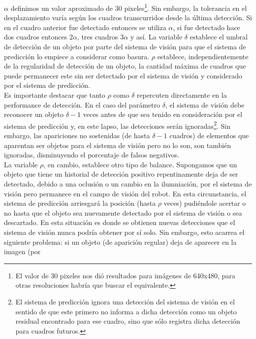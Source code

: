 $\alpha$ definimos un valor aproximado de 30 pixeles\footnote{ El 
valor de 30 pixeles nos di\'o resultados para im\'agenes de 640x480, para 
otras resoluciones habr\'ia que buscar el equivalente.}. Sin embargo, la 
tolerancia en el desplazamiento var\'ia seg\'un los cuadros transcurridos desde la \'ultima 
detecci\'on. Si en el cuadro anterior fue detectado entonces se utiliza 
$\alpha$, si fue detectado hace dos cuadros entonces $2\alpha$, tres 
cuadros $3\alpha$ y as\'i. La variable $\delta$ establece el umbral de 
detecci\'on de un objeto por parte del sistema de visi\'on para que el 
sistema de predicci\'on lo empiece  a considerar como basura. $\rho$ establece, 
independientemente de la  
regularidad de detecci\'on de un objeto, la cantidad m\'axima de cuadros que puede 
permanecer este sin ser detectado por el sistema de visi\'on y 
considerado por el sistema de predicci\'on. \\  	
\indent Es importante destacar que tanto $\rho$ como $\delta$ repercuten directamente en la 
performance de detecci\'on. En el caso del par\'ametro $\delta$, el 
sistema de visi\'on debe reconocer un objeto $\delta -1$ veces antes de que sea 
tenido en consideraci\'on por el sistema de predicci\'on y, en este lapso, las 
detecciones ser\'an ignoradas\footnote{El sistema de predicci\'on ignora 
una detecci\'on del sistema de visi\'on en el sentido de que este primero 
no informa a dicha detecci\'on como un objeto residual encontrado para 
ese cuadro, sino que s\'olo registra dicha detecci\'on para 
cuadros futuros.}. Sin embargo, las apariciones no sostenidas 
(de hasta $\delta -1$ cuadros) de elementos que aparentan ser objetos 
para el sistema de visi\'on pero no lo son, son tambi\'en ignoradas, 
disminuyendo el porcentaje de falsos negativos.\\
\indent La variable $\rho$, en cambio, establece otro tipo de balance. 
Supongamos que un objeto que tiene un historial de detecci\'on 
positivo repentinamente deja de ser detectado, debido a una oclusi\'on 
o un cambio en la ilumniaci\'on, por el sistema de visi\'on 
pero permanece en el campo de visi\'on del robot. En esta 
circunstancia, el sistema de predicci\'on 
arriesgar\'a la posici\'on (hasta $\rho$ veces) pudi\'endole acertar o no hasta que el objeto 
sea nuevamente detectado por el sistema de visi\'on o sea descartado.
En esta situaci\'on es donde se obtienen nuevas detecciones que el 
sistema de visi\'on nunca podr\'ia obtener por s\'i solo. Sin embargo, 
esto acarrea el siguiente problema: si un objeto (de aparici\'on regular) deja de aparecer en la imagen (por 
